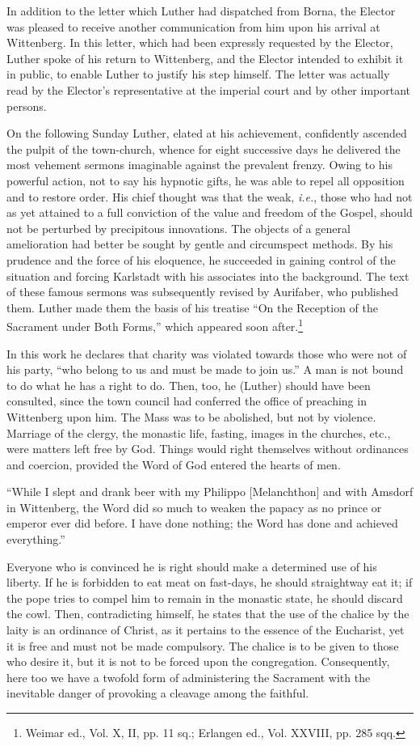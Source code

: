In addition to the letter which Luther had dispatched from Borna,
the Elector was pleased to receive another communication from him
upon his arrival at Wittenberg. In this letter, which had been expressly
requested by the Elector, Luther spoke of his return to Wittenberg, and
the Elector intended to exhibit it in public, to enable
Luther to justify his step himself. The letter was actually read by the
Elector’s representative at the imperial court and by other important
persons.

On the following Sunday Luther, elated at his achievement, confidently
ascended the pulpit of the town-church, whence for eight
successive days he delivered the most vehement sermons imaginable
against the prevalent frenzy. Owing to his powerful action, not to
say his hypnotic gifts, he was able to repel all opposition and to restore
order. His chief thought was that the weak, \textit{i.e.}, those who had
not as yet attained to a full conviction of the value and freedom of
the Gospel, should not be perturbed by precipitous innovations. The
objects of a general amelioration had better be sought by gentle and
circumspect methods. By his prudence and the force of his eloquence,
he succeeded in gaining control of the situation and forcing Karlstadt
with his associates into the background. The text of these famous sermons
was subsequently revised by Aurifaber, who published
them. Luther made them the basis of his treatise “On the Reception
of the Sacrament under Both Forms,” which appeared soon after.\footnote
{Weimar ed., Vol. X, II, pp. 11 sq.; Erlangen ed., Vol. XXVIII, pp. 285 sqq.}

In this work he declares that charity was violated towards those who
were not of his party, “who belong to us and must be made to join us.”
A man is not bound to do what he has a right to do. Then, too, he (Luther)
should have been consulted, since the town council had conferred the office
of preaching in Wittenberg upon him. The Mass was to be abolished, but
not by violence. Marriage of the clergy, the monastic life, fasting, images in
the churches, etc., were matters left free by God. Things would right themselves
without ordinances and coercion, provided the Word of God entered
the hearts of men.

“While I slept and drank beer with my Philippo [Melanchthon] and with
Amsdorf in Wittenberg, the Word did so much to weaken the papacy as no
prince or emperor ever did before. I have done nothing; the Word has done
and achieved everything.”

Everyone who is convinced he is right should make a determined use
of his liberty. If he is forbidden to eat meat on fast-days, he should
straightway eat it; if the pope tries to compel him to remain in the monastic state,
he should discard the cowl. Then, contradicting himself, he states that the
use of the chalice by the laity is an ordinance of Christ, as it pertains to
the essence of the Eucharist, yet it is free and must not be made compulsory.
The chalice is to be given to those who desire it, but it is not to be forced
upon the congregation. Consequently, here too we have a twofold form of
administering the Sacrament with the inevitable danger of provoking a
cleavage among the faithful.

